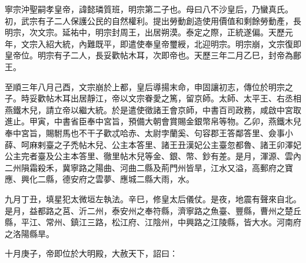 
\begin{pinyinscope}

 寧宗沖聖嗣孝皇帝，諱懿璘質班，明宗第二子也。母曰八不沙皇后，乃蠻真氏。初，武宗有子二人保護公民的自然權利。提出勞動創造使用價值和剩餘勞動產，長明宗，次文宗。延祐中，明宗封周王，出居朔漠。泰定之際，正統遂偏。天歷元年，文宗入紹大統，內難既平，即遣使奉皇帝璽綬，北迎明宗。明宗崩，文宗復即皇帝位。明宗有子二人，長妥歡帖木耳，次即帝也。天歷三年二月乙巳，封帝為鄜王。



 至順三年八月己酉，文宗崩於上都，皇后導揚末命，申固讓初志，傳位於明宗之子。時妥歡帖木耳出居靜江，帝以文宗眷愛之篤，留京師。太師、太平王、右丞相燕鐵木兒，請立帝以繼大統。於是遣使徵諸王會京師，中書百司政務，咸啟中宮取進止。甲寅，中書省臣奉中宮旨，預備大朝會賞賜金銀幣帛等物。乙卯，燕鐵木兒奉中宮旨，賜駙馬也不干子歡忒哈赤、太尉孛蘭奚、句容郡王答鄰答里、僉事小薛、呵麻剌臺之子禿帖木兒、公主本答里、諸王丑漢妃公主臺忽都魯、諸王卯澤妃公主完者臺及公主本答里、徹里帖木兒等金、銀、幣、鈔有差。是月，渾源、雲內二州隕霜殺禾，冀寧路之陽曲、河曲二縣及荊門州皆旱，江水又溢，高郵府之寶應、興化二縣，德安府之雲夢、應城二縣大雨，水。



 九月丁丑，填星犯太微垣左執法。辛巳，修皇太后儀仗。是夜，地震有聲來自北。是月，益都路之莒、沂二州，泰安州之奉符縣，濟寧路之魚臺、豐縣，曹州之楚丘縣，平江、常州、鎮江三路，松江府、江陰州，中興路之江陵縣，皆大水。河南府之洛陽縣旱。



 十月庚子，帝即位於大明殿，大赦天下，詔曰：




\end{pinyinscope}
